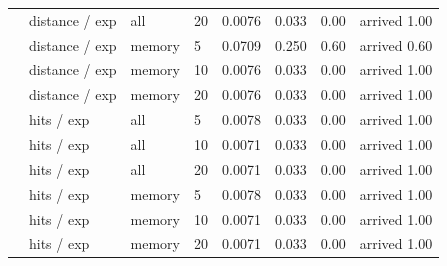 \begin{tabular}{llllcccc}
 & distance / exp & all & 20 & 0.0076 & 0.033 & 0.00 & arrived 1.00 \\
 & distance / exp & memory & 5 & 0.0709 & 0.250 & 0.60 & arrived 0.60 \\
 & distance / exp & memory & 10 & 0.0076 & 0.033 & 0.00 & arrived 1.00 \\
 & distance / exp & memory & 20 & 0.0076 & 0.033 & 0.00 & arrived 1.00 \\
 & hits / exp & all & 5 & 0.0078 & 0.033 & 0.00 & arrived 1.00 \\
 & hits / exp & all & 10 & 0.0071 & 0.033 & 0.00 & arrived 1.00 \\
 & hits / exp & all & 20 & 0.0071 & 0.033 & 0.00 & arrived 1.00 \\
 & hits / exp & memory & 5 & 0.0078 & 0.033 & 0.00 & arrived 1.00 \\
 & hits / exp & memory & 10 & 0.0071 & 0.033 & 0.00 & arrived 1.00 \\
 & hits / exp & memory & 20 & 0.0071 & 0.033 & 0.00 & arrived 1.00 \\
\bottomrule
\end{tabular}
